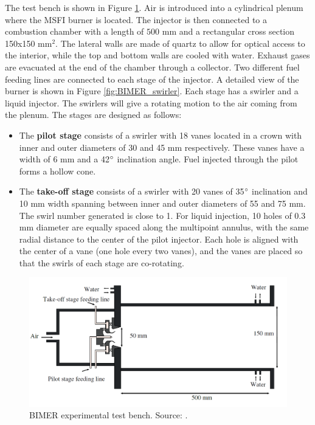 The test bench is shown in Figure \ref{fig:BIMER_test_bench_expe_maquette}. Air is introduced into a cylindrical plenum where the MSFI burner is located. The injector is then connected to a combustion chamber with a length of $500$ mm and a rectangular cross section 150x150 mm$^2$. The lateral walls are made of quartz to allow for optical access to the interior, while the top and bottom walls are cooled with water. Exhaust gases are evacuated at the end of the chamber through a collector. Two different fuel feeding lines are connected to each stage of the injector. A detailed view of the burner is shown in Figure \ref{fig:BIMER_swirler}. Each stage has a swirler and a liquid injector. The swirlers will give a rotating motion to the air coming from the plenum. The stages are designed as follows:

\begin{itemize}

	\item The \textbf{pilot stage} consists of a swirler with 18 vanes located in a crown with inner and outer diameters of 30 and 45 mm respectively. These vanes have a width of 6 mm and a 42$\degree$ inclination angle. Fuel injected through the pilot forms a hollow cone.
	
	\item The \textbf{take-off stage} consists of a swirler with 20 vanes of 35$\degree$ inclination and 10 mm width spanning between inner and outer diameters of 55 and 75 mm. The swirl number generated is close to 1. For liquid injection, 10 holes of $0.3$ mm diameter are equally spaced along the multipoint annulus, with the same radial distance to the center of the pilot injector. Each hole is aligned with the center of a vane (one hole every two vanes), and the vanes are placed so that the swirls of each stage are co-rotating.

\end{itemize}

\begin{figure}[h!]
	\centering
	\includegraphics[scale=0.35]{./part3_applications/figures_ch7_aero/BIMER_test_bench_expe_maquette}
	\caption[BIMER experimental test bench]{BIMER experimental test bench. Source: .}
	\label{fig:BIMER_test_bench_expe_maquette}
\end{figure}

